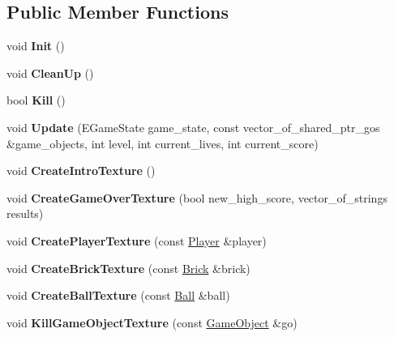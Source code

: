 \subsection*{Public Member Functions}
\begin{DoxyCompactItemize}
\item 
\hypertarget{class_s_d_lvideo_aaf4d2054fa5a4a05a37d3f1c0cc3b728}{}void {\bfseries Init} ()\label{class_s_d_lvideo_aaf4d2054fa5a4a05a37d3f1c0cc3b728}

\item 
\hypertarget{class_s_d_lvideo_ab15173dc06278a380a59e512020cb40c}{}void {\bfseries Clean\+Up} ()\label{class_s_d_lvideo_ab15173dc06278a380a59e512020cb40c}

\item 
\hypertarget{class_s_d_lvideo_a5f6045e76aeac461a424597ac4905183}{}bool {\bfseries Kill} ()\label{class_s_d_lvideo_a5f6045e76aeac461a424597ac4905183}

\item 
\hypertarget{class_s_d_lvideo_ab8588460623d611ef25951514eaf1729}{}void {\bfseries Update} (E\+Game\+State game\+\_\+state, const vector\+\_\+of\+\_\+shared\+\_\+ptr\+\_\+gos \&game\+\_\+objects, int level, int current\+\_\+lives, int current\+\_\+score)\label{class_s_d_lvideo_ab8588460623d611ef25951514eaf1729}

\item 
\hypertarget{class_s_d_lvideo_ad10a8ab09774fb1771029e60146ed794}{}void {\bfseries Create\+Intro\+Texture} ()\label{class_s_d_lvideo_ad10a8ab09774fb1771029e60146ed794}

\item 
\hypertarget{class_s_d_lvideo_a06674910d743bb041e69f8cb40440f8c}{}void {\bfseries Create\+Game\+Over\+Texture} (bool new\+\_\+high\+\_\+score, vector\+\_\+of\+\_\+strings results)\label{class_s_d_lvideo_a06674910d743bb041e69f8cb40440f8c}

\item 
\hypertarget{class_s_d_lvideo_aa7004dc8ba964525a7725682e7ee1621}{}void {\bfseries Create\+Player\+Texture} (const \hyperlink{class_player}{Player} \&player)\label{class_s_d_lvideo_aa7004dc8ba964525a7725682e7ee1621}

\item 
\hypertarget{class_s_d_lvideo_a592243f65a44b39361367228161c273e}{}void {\bfseries Create\+Brick\+Texture} (const \hyperlink{class_brick}{Brick} \&brick)\label{class_s_d_lvideo_a592243f65a44b39361367228161c273e}

\item 
\hypertarget{class_s_d_lvideo_ad0b3b6623069a38ab9ec7250527139a4}{}void {\bfseries Create\+Ball\+Texture} (const \hyperlink{class_ball}{Ball} \&ball)\label{class_s_d_lvideo_ad0b3b6623069a38ab9ec7250527139a4}

\item 
\hypertarget{class_s_d_lvideo_aaaa0f579f5035b50218be9e52fc778b3}{}void {\bfseries Kill\+Game\+Object\+Texture} (const \hyperlink{class_game_object}{Game\+Object} \&go)\label{class_s_d_lvideo_aaaa0f579f5035b50218be9e52fc778b3}

\end{DoxyCompactItemize}
